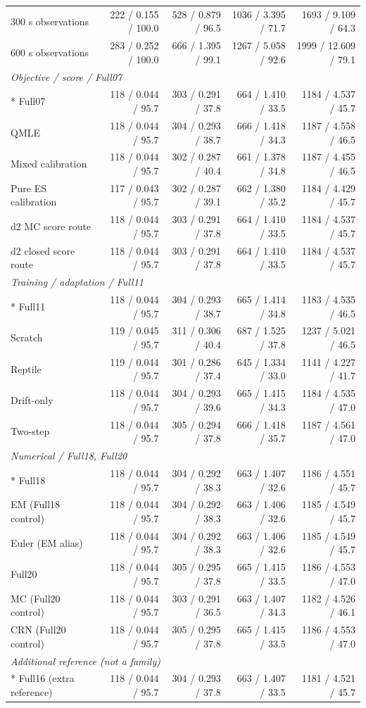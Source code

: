 \begin{longtable}{@{}p{.25\linewidth}rrrr@{}}
300 s observations & 222 / 0.155 / 100.0 & 528 / 0.879 / 96.5 & 1036 / 3.395 / 71.7 & 1693 / 9.109 / 64.3\\
600 s observations & 283 / 0.252 / 100.0 & 666 / 1.395 / 99.1 & 1267 / 5.058 / 92.6 & 1999 / 12.609 / 79.1\\
\midrule
\multicolumn{5}{l}{\textit{Objective / score / Full07}}\\*
Full07 & 118 / 0.044 / 95.7 & 303 / 0.291 / 37.8 & 664 / 1.410 / 33.5 & 1184 / 4.537 / 45.7\\
QMLE & 118 / 0.044 / 95.7 & 304 / 0.293 / 38.7 & 666 / 1.418 / 34.3 & 1187 / 4.558 / 46.5\\
Mixed calibration & 118 / 0.044 / 95.7 & 302 / 0.287 / 40.4 & 661 / 1.378 / 34.8 & 1187 / 4.455 / 46.5\\
Pure ES calibration & 117 / 0.043 / 95.7 & 302 / 0.287 / 39.1 & 662 / 1.380 / 35.2 & 1184 / 4.429 / 45.7\\
d2 MC score route & 118 / 0.044 / 95.7 & 303 / 0.291 / 37.8 & 664 / 1.410 / 33.5 & 1184 / 4.537 / 45.7\\
d2 closed score route & 118 / 0.044 / 95.7 & 303 / 0.291 / 37.8 & 664 / 1.410 / 33.5 & 1184 / 4.537 / 45.7\\
\midrule
\multicolumn{5}{l}{\textit{Training / adaptation / Full11}}\\*
Full11 & 118 / 0.044 / 95.7 & 304 / 0.293 / 38.7 & 665 / 1.414 / 34.8 & 1183 / 4.535 / 46.5\\
Scratch & 119 / 0.045 / 95.7 & 311 / 0.306 / 40.4 & 687 / 1.525 / 37.8 & 1237 / 5.021 / 46.5\\
Reptile & 119 / 0.044 / 95.7 & 301 / 0.286 / 37.4 & 645 / 1.334 / 33.0 & 1141 / 4.227 / 41.7\\
Drift-only & 118 / 0.044 / 95.7 & 304 / 0.293 / 39.6 & 665 / 1.415 / 34.3 & 1184 / 4.535 / 47.0\\
Two-step & 118 / 0.044 / 95.7 & 305 / 0.294 / 37.8 & 666 / 1.418 / 35.7 & 1187 / 4.561 / 47.0\\
\midrule
\multicolumn{5}{l}{\textit{Numerical / Full18, Full20}}\\*
Full18 & 118 / 0.044 / 95.7 & 304 / 0.292 / 38.3 & 663 / 1.407 / 32.6 & 1186 / 4.551 / 45.7\\
EM (Full18 control) & 118 / 0.044 / 95.7 & 304 / 0.292 / 38.3 & 663 / 1.406 / 32.6 & 1185 / 4.549 / 45.7\\
Euler (EM alias) & 118 / 0.044 / 95.7 & 304 / 0.292 / 38.3 & 663 / 1.406 / 32.6 & 1185 / 4.549 / 45.7\\
Full20 & 118 / 0.044 / 95.7 & 305 / 0.295 / 37.8 & 665 / 1.415 / 33.5 & 1186 / 4.553 / 47.0\\
MC (Full20 control) & 118 / 0.044 / 95.7 & 303 / 0.291 / 36.5 & 663 / 1.407 / 34.3 & 1182 / 4.526 / 46.1\\
CRN (Full20 control) & 118 / 0.044 / 95.7 & 305 / 0.295 / 37.8 & 665 / 1.415 / 33.5 & 1186 / 4.553 / 47.0\\
\midrule
\multicolumn{5}{l}{\textit{Additional reference (not a family)}}\\*
Full16 (extra reference) & 118 / 0.044 / 95.7 & 304 / 0.293 / 37.8 & 663 / 1.407 / 33.5 & 1181 / 4.521 / 45.7\\
\end{longtable}

